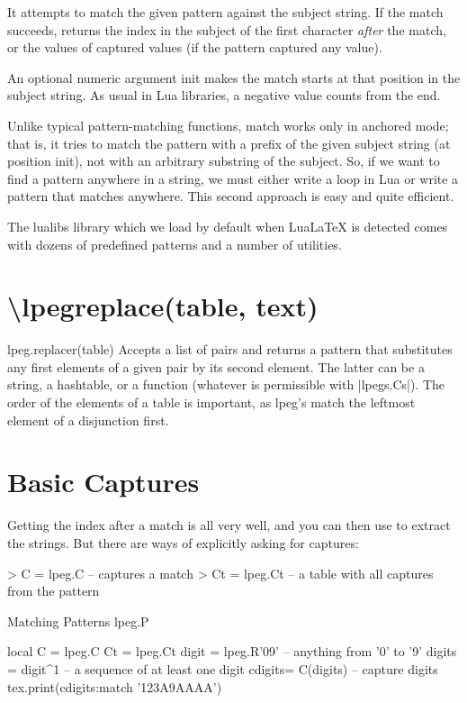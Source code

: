 It attempts to match the given pattern against the subject string. If the match succeeds, returns the index in the subject of the first character \emph{after} the match, or the values of captured values (if the pattern captured any value).

An optional numeric argument init makes the match starts at that position in the subject string. As usual in Lua libraries, a negative value counts from the end.

Unlike typical pattern-matching functions, match works only in anchored mode; that is, it tries to match the pattern with a prefix of the given subject string (at position init), not with an arbitrary substring of the subject. So, if we want to find a pattern anywhere in a string, we must either write a loop in Lua or write a pattern that matches anywhere. This second approach is easy and quite efficient.

The lualibs library which we load by default when LuaLaTeX is detected comes with dozens of predefined patterns and a number of utilities.

\section[\textbackslash lpegreplace]{\textbackslash lpegreplace(table, text)}

\begin{docLpeg}{lpeg.replacer(table)}
Accepts a list of pairs and returns a pattern that substitutes any first elements of a given pair by its second element. The latter can be a string, a hashtable, or a function (whatever is permissible with |lpegs.Cs|).
The order of the elements of a table is important, as lpeg's match the leftmost element of a disjunction first.
\end{docLpeg}


\section{Basic Captures}

Getting the index after a match is all very well, and you can then use  to extract the strings. But there are ways of explicitly asking for captures:

\begin{phdverbatim}
> C = lpeg.C  -- captures a match
> Ct = lpeg.Ct -- a table with all captures from the pattern
\end{phdverbatim}


\begin{texexample}{Matching Patterns lpeg.P}{}
\begin{luacode}
 local C = lpeg.C
 Ct = lpeg.Ct
 digit = lpeg.R'09'  --  anything from '0' to '9'
 digits = digit^1    --  a sequence of at least one digit
 cdigits= C(digits)  --  capture digits
 tex.print(cdigits:match '123A9AAAA')
\end{luacode}
\end{texexample}



